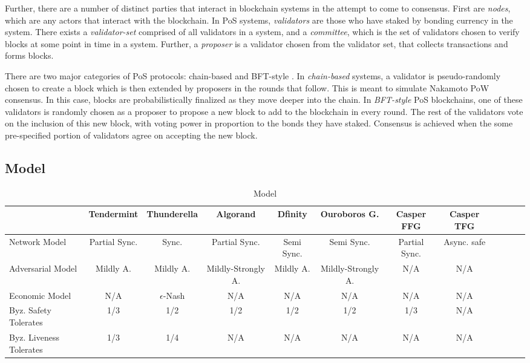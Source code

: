\documentclass[10pt,journal,compsoc]{IEEEtran}
\begin{document}
Further, there are a number of distinct parties that interact in blockchain systems in the attempt to come to consensus. First are \emph{nodes}, which are any actors that interact with the blockchain. In PoS systems, \emph{validators} are those who have staked by bonding currency in the system. There exists a \emph{validator-set} comprised of all validators in a system, and a \emph{committee}, which is the set of validators chosen to verify blocks at some point in time in a system. Further, a \emph{proposer} is a validator chosen from the validator set, that collects transactions and forms blocks.
 
There are two major categories of PoS protocols: chain-based and BFT-style \cite{EthPoSFAQ}. In \emph{chain-based} systems, a validator is pseudo-randomly chosen to create a block which is then extended by proposers in the rounds that follow. This is meant to simulate Nakamoto PoW consensus. In this case, blocks are probabilistically finalized as they move deeper into the chain. In \emph{BFT-style} PoS blockchains, one of these validators is randomly chosen as a proposer to propose a new block to add to the blockchain in every round. The rest of the validators vote on the inclusion of this new block, with voting power in proportion to the bonds they have staked. Consensus is achieved when the some pre-specified portion of validators agree on accepting the new block. 

\subsection{Model}

\begin{table*}[htdp]
 \caption{Model}
\label{}
\begin{tabularx}{\textwidth}{@{}l*{10}{C}c@{}}
\toprule
                 & Tendermint & Thunderella & Algorand & Dfinity & Ouroboros G. & Casper FFG & Casper TFG\\ 
\midrule
Network Model    & Partial Sync.  & Sync.   & Partial Sync.   & Semi Sync.  & Semi Sync.  & Partial Sync.  & Async. safe  \\
\addlinespace
Adversarial Model & Mildly A.  & Mildly A.  & Mildly-Strongly A.  & Mildly A. & Mildly-Strongly A. & N/A & N/A\\ 
\addlinespace
Economic Model & N/A  & $\epsilon$-Nash  & N/A &  N/A & N/A &  N/A & N/A\\ 
\addlinespace
Byz. Safety Tolerates & 1/3  & 1/2  & 1/2 &  1/2 & 1/2 & 1/3 & N/A\\ 

\addlinespace
Byz. Liveness Tolerates & 1/3  & 1/4  & N/A &  N/A & N/A &  N/A & N/A\\ 

\bottomrule
\end{tabularx}
\end{table*}
\end{document}

